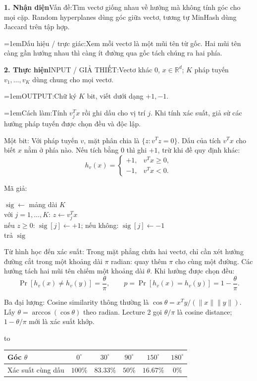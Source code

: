 \documentclass[10pt,a4paper,twocolumn]{article}
\makeatletter
\newcommand{\key}[1]{#1:\enspace}
\newenvironment{examtable}[1]{%
  \par\addvspace{2pt}\noindent\hbox to \linewidth\bgroup\hfil
  \setlength{\tabcolsep}{4pt}%
  \renewcommand{\arraystretch}{1.12}\begin{tabular}{#1}%
}{\end{tabular}\hfil\egroup\par\addvspace{2pt}}
\newcommand{\algfield}[2]{\par\noindent\hangindent=1em\relax#1:\enspace#2}
\newcommand{\unitfield}[4]{%
  \par\noindent\textbf{#1. #2}\enspace #3:\enspace #4}
\newcommand{\algsummary}[6]{%
  \begingroup\setlength{\parskip}{1pt}%
  \unitfield{1}{Nhận diện}{Vấn đề}{#1}%
  \algfield{Dấu hiệu / trực giác}{#2}%
  \if\relax\detokenize{#3}\relax\else\par\noindent#3\par\fi%
  \unitfield{2}{Thực hiện}{INPUT / GIẢ THIẾT}{#4}%
  \algfield{OUTPUT}{#5}%
  \algfield{Cách làm}{#6}\par\endgroup}
\newenvironment{algpseudo}{%
  \par\addvspace{2pt}\noindent
  \setlength{\parskip}{0pt}%
  Mã giả:\par\nobreak
  \begin{list}{}{\setlength{\leftmargin}{1em}\setlength{\topsep}{0pt}%
    \setlength{\partopsep}{0pt}\setlength{\parsep}{0pt}%
    \@beginparpenalty=10000\relax}%
  \item\relax
}{\end{list}\par\addvspace{3pt}}
\makeatother
\begin{document}
\algsummary{Tìm vectơ giống nhau về hướng mà không tính góc cho mọi cặp. Random hyperplanes dùng góc giữa vectơ, tương tự MinHash dùng Jaccard trên tập hợp.}{Xem mỗi vectơ là một mũi tên từ gốc. Hai mũi tên càng gần hướng nhau thì càng ít đường qua gốc tách chúng ra hai phía.}{}{Vectơ khác 0, $x\in\mathbb R^d$; $K$ pháp tuyến $v_1,\ldots,v_K$ dùng chung cho mọi vectơ.}{Chữ ký $K$ bit, viết dưới dạng $+1,-1$.}{Tính $v_j^Tx$ rồi ghi dấu cho vị trí $j$. Khi tính xác suất, giả sử các hướng pháp tuyến được chọn đều và độc lập.}

\key{Một bit} Với pháp tuyến $v$, mặt phân chia là $\{z:v^Tz=0\}$. Dấu của tích $v^Tx$ cho biết $x$ nằm ở phía nào. Nếu tích bằng 0 thì ghi $+1$, trừ khi đề quy định khác:
\[
h_v(x)=\begin{cases}+1,&v^Tx\ge0,\\-1,&v^Tx<0.\end{cases}
\]

\begin{algpseudo}
$\operatorname{sig}\gets$ mảng dài $K$\\
với $j=1,\ldots,K$: $z\gets v_j^Tx$\\
\quad nếu $z\ge0$: $\operatorname{sig}[j]\gets+1$; nếu không: $\operatorname{sig}[j]\gets-1$\\
trả $\operatorname{sig}$
\end{algpseudo}

\begin{samepage}
\key{Từ hình học đến xác suất} Trong mặt phẳng chứa hai vectơ, chỉ cần xét hướng đường cắt trong một khoảng dài $\pi$ radian: quay thêm $\pi$ cho cùng một đường. Các hướng tách hai mũi tên chiếm một khoảng dài $\theta$. Khi hướng được chọn đều:
\[
\Pr[h_v(x)\ne h_v(y)]=\frac{\theta}{\pi},\qquad
p=\Pr[h_v(x)=h_v(y)]=1-\frac{\theta}{\pi}.
\]
\end{samepage}
\key{Ba đại lượng} Cosine similarity thông thường là $\cos\theta=x^Ty/(\|x\|\|y\|)$. Lấy $\theta=\arccos(\cos\theta)$ theo radian. Lecture 2 gọi $\theta/\pi$ là cosine distance; $1-\theta/\pi$ mới là xác suất khớp.

\begin{examtable}{@{}lccccc@{}}
\toprule
Góc $\theta$ & $0^\circ$ & $30^\circ$ & $90^\circ$ & $150^\circ$ & $180^\circ$ \\
\midrule
Xác suất cùng dấu & $100\%$ & $83.33\%$ & $50\%$ & $16.67\%$ & $0\%$ \\
\bottomrule
\end{examtable}
\end{document}
